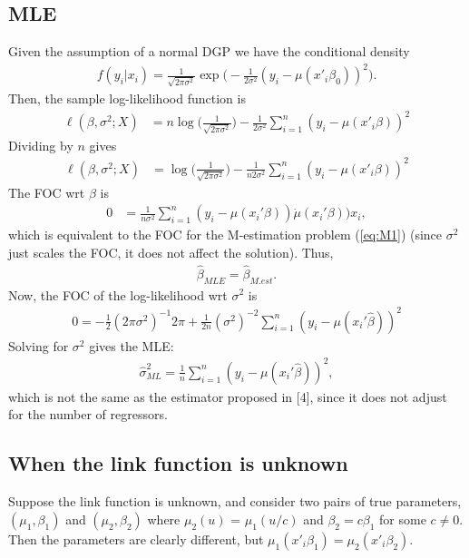 \documentclass[12pt]{article}
\newcommand{\mtx}[1]{\ensuremath{\bm{\mathit{#1}}}}
\begin{document}
\subsection{MLE}
Given the assumption of a normal DGP we have the conditional density
\begin{align*}
f(y_i|\mtx{x}_i) = \frac{1}{\sqrt{2\pi\sigma^2}}\exp\Big(-\frac{1}{2\sigma^2}(y_i - \mu(\mtx{x}'_i\mtx{\beta}_0))^2\Big).
\end{align*}
Then, the sample log-likelihood function is
\begin{align*}
\ell(\mtx{\beta}, \sigma^2; \mtx{X}) &= n \log\Big(\frac{1}{\sqrt{2\pi\sigma^2}}\Big) -\frac{1}{2\sigma^2}\sum_{i=1}^n(y_i - \mu(\mtx{x}'_i\mtx{\beta}))^2
\end{align*}
Dividing by $n$ gives
\begin{align*}
\ell(\mtx{\beta},\sigma^2; \mtx{X}) &= \log\Big(\frac{1}{\sqrt{2\pi\sigma^2}}\Big) -\frac{1}{n2\sigma^2}\sum_{i=1}^n(y_i - \mu(\mtx{x}'_i\mtx{\beta}))^2
\end{align*}
The FOC wrt $\mtx{\beta}$ is
\begin{align*}
0 &= \frac{1}{n\sigma^2} \sum_{i=1}^n (y_i-\mu(\mtx{x}_i'\mtx{\beta}))\dot{\mu}(\mtx{x}_i'\mtx{\beta}))\mtx{x}_i,
\end{align*}
which is equivalent to the FOC for the M-estimation problem (\ref{eq:M1}) (since $\sigma^2$ just scales the FOC, it does not affect the solution). Thus,
\begin{align*}
\hat{\mtx{\beta}}_{MLE} =\hat{\mtx{\beta}}_{M.est}.
\end{align*}
Now, the FOC of the log-likelihood wrt $\sigma^2$ is
\begin{align*}
0 = -\frac{1}{2}(2\pi\sigma^2)^{-1}2\pi + \frac{1}{2n}(\sigma^2)^{-2} \sum_{i=1}^n (y_i-\mu(\mtx{x}_i'\hat{\mtx{\beta}}))^2
\end{align*}
Solving for $\sigma^2$ gives the MLE:
\begin{align*}
\hat \sigma^2_{ML} = \frac{1}{n} \sum_{i=1}^n (y_i-\mu(\mtx{x}_i'\hat{\mtx{\beta}}))^2,
\end{align*}
which is not the same as the estimator proposed in [4], since it does not adjust for the number of regressors.

\subsection{When the link function is unknown}
Suppose the link function is unknown, and consider two pairs of true parameters, $(\mu_1,{\mtx{\beta}}_1)$ and $(\mu_2,{\mtx{\beta}}_2)$ where $\mu_2(u)$ = $\mu_1(u/c)$ and ${\mtx{\beta}}_2= c{\mtx{\beta}}_1$ for some $c\neq 0$. Then the parameters are clearly different, but $\mu_1(\mtx{x}'_i\mtx{\beta}_1)=\mu_2(\mtx{x}'_i\mtx{\beta}_2)$. 
\end{document}
